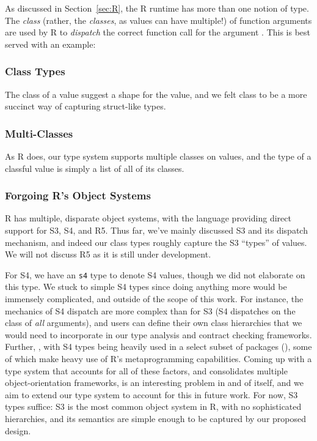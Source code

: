 \documentclass[acmsmall,review,anonymous]{acmart}\settopmatter{printfolios=true,printccs=false,printacmref=false}
\newcommand{\code}[1]{{\lstinline[style=Rin]!#1!}\xspace}
\begin{document}
As discussed in Section~\ref{sec:R}, the R runtime has more than one notion of type.
The {\it class} (rather, the {\it classes}, as values can have multiple!) of function arguments are used by R to {\it dispatch} the correct function call for the argument .
This is best served with an example:

%
%
\subsubsection{Class Types}

The class of a value suggest a shape for the value, and we felt class to be a more succinct way of capturing struct-like types. 


%
%
\subsubsection{Multi-Classes}

As R does, our type system supports multiple classes on values, and the type of a classful value is simply a list of all of its classes. 


%
%
\subsubsection{Forgoing R's Object Systems}

R has multiple, disparate object systems, with the language providing direct support for S3, S4, and R5.
Thus far, we've mainly discussed S3 and its dispatch mechanism, and indeed our class types roughly capture the S3 ``types'' of values.
We will not discuss R5 as it is still under development.

For S4, we have an \code{s4} type to denote S4 values, though we did not elaborate on this type.
We stuck to simple S4 types since doing anything more would be immensely complicated, and outside of the scope of this work.
For instance, the mechanics of S4 dispatch are more complex than for S3 (S4 dispatches on the class of {\it all} arguments), and users can define their own class hierarchies that we would need to incorporate in our type analysis and contract checking frameworks.
Further, , with S4 types being heavily used in a select subset of packages (), some of which make heavy use of R's metaprogramming capabilities.
Coming up with a type system that accounts for all of these factors, and consolidates multiple object-orientation frameworks, is an interesting problem in and of itself, and we aim to extend our type system to account for this in future work.
For now, S3 types suffice: S3 is the most common object system in R, with no sophisticated hierarchies, and its semantics are simple enough to be captured by our proposed design.
\end{document}
